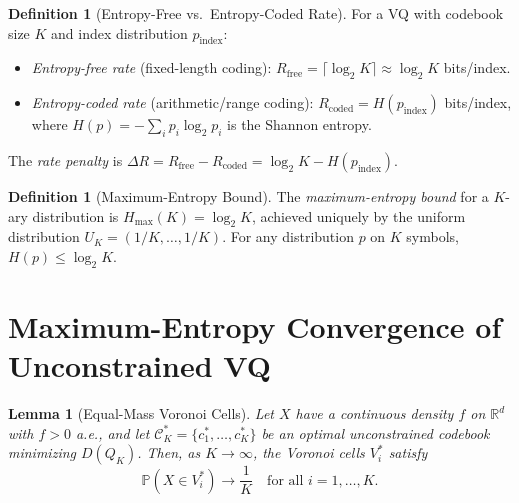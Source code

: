 \documentclass[11pt,a4paper]{article}
\newtheorem{lemma}[theorem]{Lemma}
\theoremstyle{definition}
\newtheorem{definition}[theorem]{Definition}
\theoremstyle{remark}
\newcommand{\R}{\mathbb{R}}
\newcommand{\PP}{\mathbb{P}}
\begin{document}
\begin{definition}[Entropy-Free vs.\ Entropy-Coded Rate]
\label{def:rates}
For a VQ with codebook size $K$ and index distribution $p_{\mathrm{index}}$:
\begin{itemize}[nosep]
  \item \emph{Entropy-free rate} (fixed-length coding):
    $R_{\mathrm{free}} = \lceil \log_2 K \rceil \approx \log_2 K$ bits/index.
  \item \emph{Entropy-coded rate} (arithmetic/range coding):
    $R_{\mathrm{coded}} = H(p_{\mathrm{index}})$ bits/index,
    where $H(p) = -\sum_i p_i \log_2 p_i$ is the Shannon entropy.
\end{itemize}
The \emph{rate penalty} is
$\Delta R = R_{\mathrm{free}} - R_{\mathrm{coded}} = \log_2 K - H(p_{\mathrm{index}})$.
\end{definition}

\begin{definition}[Maximum-Entropy Bound]
\label{def:max-entropy}
The \emph{maximum-entropy bound} for a $K$-ary distribution is
$H_{\max}(K) = \log_2 K$, achieved uniquely by the uniform distribution
$U_K = (1/K, \ldots, 1/K)$.
For any distribution $p$ on $K$ symbols, $H(p) \le \log_2 K$.
\end{definition}

\section{Maximum-Entropy Convergence of Unconstrained VQ}

\begin{lemma}[Equal-Mass Voronoi Cells]
\label{lemma:equal-mass}
Let $X$ have a continuous density $f$ on $\R^d$ with $f > 0$ a.e., and let
$\mathcal{C}_K^* = \{c_1^*, \ldots, c_K^*\}$ be an optimal unconstrained
codebook minimizing $D(Q_K)$. Then, as $K \to \infty$, the Voronoi cells
$V_i^*$ satisfy
\[
\PP(X \in V_i^*) \to \frac{1}{K} \quad \text{for all } i = 1, \ldots, K.
\]
\end{lemma}
\end{document}
